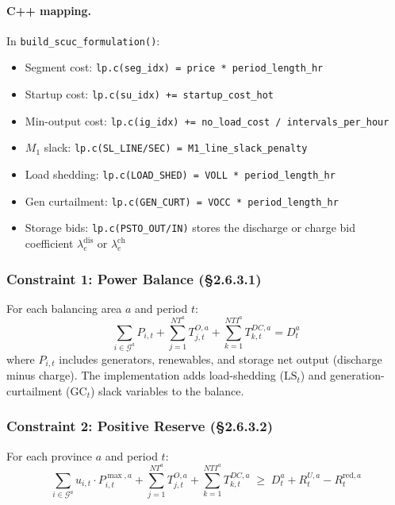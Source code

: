 \paragraph{C++ mapping.}
In \texttt{build\_scuc\_formulation()}:
\begin{itemize}[nosep]
  \item Segment cost: \texttt{lp.c(seg\_idx) = price * period\_length\_hr}
  \item Startup cost: \texttt{lp.c(su\_idx) += startup\_cost\_hot}
  \item Min-output cost: \texttt{lp.c(ig\_idx) += no\_load\_cost / intervals\_per\_hour}
  \item $M_1$ slack: \texttt{lp.c(SL\_LINE/SEC) = M1\_line\_slack\_penalty}
  \item Load shedding: \texttt{lp.c(LOAD\_SHED) = VOLL * period\_length\_hr}
  \item Gen curtailment: \texttt{lp.c(GEN\_CURT) = VOCC * period\_length\_hr}
  \item Storage bids: \texttt{lp.c(PSTO\_OUT/IN)} stores the discharge or charge bid coefficient \(\lambda_e^{\mathrm{dis}}\) or \(\lambda_e^{\mathrm{ch}}\)
\end{itemize}

\subsubsection{Constraint 1: Power Balance (§2.6.3.1)}\label{sec:scuc-balance}

For each balancing area $a$ and period $t$:
\begin{equation}\label{eq:power-balance}
  \sum_{i \in \mathcal{G}^a} P_{i,t}
  + \sum_{j=1}^{NT^a} T^{O,a}_{j,t}
  + \sum_{k=1}^{NTI^a} T^{DC,a}_{k,t}
  = D^{a}_{t}
\end{equation}
where $P_{i,t}$ includes generators, renewables, and storage net output
(discharge minus charge). The implementation adds load-shedding
($\mathrm{LS}_t$) and generation-curtailment ($\mathrm{GC}_t$) slack
variables to the balance.

\subsubsection{Constraint 2: Positive Reserve (§2.6.3.2)}\label{sec:scuc-pos-reserve}

For each province $a$ and period $t$:
\begin{equation}\label{eq:pos-reserve}
  \sum_{i \in \mathcal{G}^a}
    u_{i,t} \cdot P^{\max,a}_{i,t}
  + \sum_{j=1}^{NT^a} T^{O,a}_{j,t}
  + \sum_{k=1}^{NTI^a} T^{DC,a}_{k,t}
  \;\geq\;
  D^{a}_{t} + R^{U,a}_{t} - R^{\mathrm{red},a}_{t}
\end{equation}

